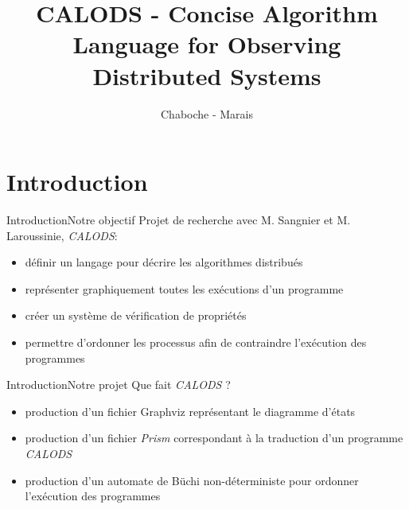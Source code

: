 \documentclass[11pt]{beamer}
\author{Chaboche - Marais}
\title{CALODS - Concise Algorithm Language for Observing Distributed Systems}
\begin{document}
\begin{frame}
\titlepage
\end{frame}

\begin{frame}
\tableofcontents
\end{frame}

\section{Introduction}
\begin{frame}{Introduction}{Notre objectif}
Projet de recherche avec M. Sangnier et M. Laroussinie, \textit{CALODS}:
\begin{itemize}
  \item définir un langage pour décrire les algorithmes distribués
  \item représenter graphiquement toutes les exécutions d'un programme
  \item créer un système de vérification de propriétés
  \item permettre d'ordonner les processus afin de contraindre l'exécution des programmes
\end{itemize}
\end{frame}

\begin{frame}{Introduction}{Notre projet}
Que fait \textit{CALODS} ?
\begin{itemize}
  \item production d'un fichier Graphviz représentant le diagramme d'états
  \item production d'un fichier \textit{Prism} correspondant à la traduction d'un programme \textit{CALODS}
  \item production d'un automate de Büchi non-déterministe pour ordonner l'exécution des programmes
\end{itemize}
\end{frame}
\end{document}
